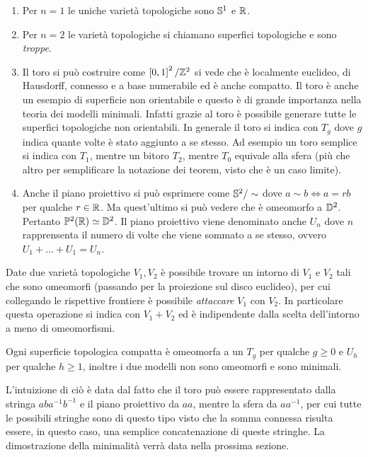 \begin{enumerate}
	\item Per $n=1$ le uniche varietà topologiche sono $\S^1$ e $\R$.
	\item Per $n=2$ le varietà topologiche si chiamano superfici topologiche e sono \textit{troppe}.
	\item Il toro si può costruire come $\left[0,1\right]^2/\Z^2$ si vede che è localmente euclideo, di Hausdorff, connesso e a base numerabile ed è anche compatto. Il toro è anche un esempio di superficie non orientabile e questo è di grande importanza nella teoria dei modelli minimali. Infatti grazie al toro è possibile generare tutte le superfici topologiche non orientabili. In generale il toro si indica con $T_g$ dove $g$ indica quante volte è stato aggiunto a  se stesso. Ad esempio un toro semplice si indica con $T_1$, mentre un bitoro $T_2$, mentre $T_0$ equivale alla sfera (più che altro per semplificare la notazione dei teorem, visto che è un caso limite).
	\item Anche il piano proiettivo si può esprimere come $\S^2 / \sim$ dove $a \sim b \Leftrightarrow a = rb$ per qualche $r \in \R$. Ma quest'ultimo si può vedere che è omeomorfo a $\D^2$. Pertanto $\mathbb{P}^2(\R) \simeq \D^2$. Il piano proiettivo viene denominato anche $U_n$ dove $n$ rapprensenta il numero di volte che viene sommato a se stesso, ovvero $U_1 + \dots + U_1 = U_n$.
\end{enumerate}

\begin{definition}
	Date due varietà topologiche $V_1, V_2$ è possibile trovare un intorno di $V_1$ e $V_2$ tali che sono omeomorfi (passando per la proiezione sul disco euclideo), per cui collegando le rispettive frontiere è possibile \textit{attaccare} $V_1$ con $V_2$. In particolare questa operazione si indica con $V_1 + V_2$ ed è indipendente dalla scelta dell'intorno a meno di omeomorfismi. 
\end{definition}


\begin{theorem}
	Ogni superficie topologica compatta è omeomorfa a un $T_g$ per qualche $g \ge 0$ e $U_h$ per qualche $h \ge 1$, inoltre i due modelli non sono omeomorfi e sono minimali. 
\end{theorem}

L'intuizione di ciò è data dal fatto che il toro può essere rappresentato dalla stringa $aba^{-1}b^{-1}$ e il piano proiettivo da $aa$, mentre la sfera da $aa^{-1}$, per cui tutte le possibili stringhe sono di questo tipo visto che la somma connessa risulta essere, in questo caso, una semplice concatenazione di queste stringhe. La dimostrazione della minimalità verrà data nella prossima sezione.


